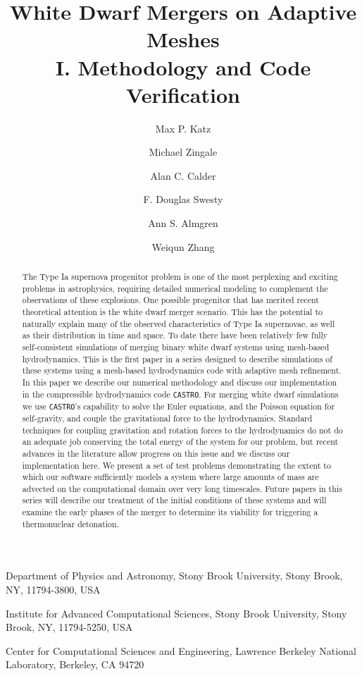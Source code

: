 \documentclass[iop,numberedappendix]{../emulateapj}
\newcommand{\castro}{\texttt{CASTRO}}
\begin{document}
\title{White Dwarf Mergers on Adaptive Meshes\\ I. Methodology and Code Verification}


\author{Max P. Katz}
\author{Michael Zingale}
\author{Alan C. Calder}
\author{F. Douglas Swesty}
\author{Ann S. Almgren}
\author{Weiqun Zhang}

{
  Department of Physics and Astronomy,
  Stony Brook University, Stony Brook, NY, 11794-3800, USA
}

{
  Institute for Advanced Computational Sciences,
  Stony Brook University, Stony Brook, NY, 11794-5250, USA
}

{
  Center for Computational Sciences and Engineering,
  Lawrence Berkeley National Laboratory, Berkeley, CA 94720
}

\begin{abstract}
The Type Ia supernova progenitor problem is one of the most perplexing and 
exciting problems in astrophysics, requiring detailed numerical modeling to 
complement the observations of these explosions. One possible progenitor that has 
merited recent theoretical attention is the white dwarf merger scenario.
This has the potential to naturally explain many of the observed characteristics of 
Type Ia supernovae, as well as their distribution in time and space.
To date there have been relatively few fully self-consistent simulations 
of merging binary white dwarf systems using mesh-based hydrodynamics. 
This is the first paper in a series designed to 
describe simulations of these systems using a mesh-based hydrodynamics code with 
adaptive mesh refinement. In this paper we describe our numerical 
methodology and discuss our implementation in the compressible hydrodynamics code \castro.
For merging white dwarf simulations we use \castro's capability to solve the Euler equations, and
the Poisson equation for self-gravity, and couple the gravitational force to the hydrodynamics.
Standard techniques for coupling gravitation and rotation forces to the hydrodynamics do 
not do an adequate job conserving the total energy of the system for our problem, 
but recent advances in the literature allow progress on this 
issue and we discuss our implementation here. We present a
set of test problems demonstrating the extent to which our software sufficiently
models a system where large amounts of mass are advected on the computational 
domain over very long timescales. Future papers in this series will describe
our treatment of the initial conditions of these systems and will 
examine the early phases of the merger to determine its viability
for triggering a thermonuclear detonation.

\end{abstract}
\end{document}
